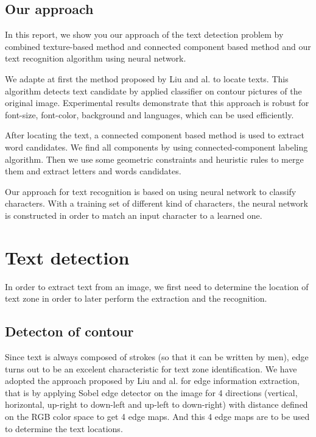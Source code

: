 \documentclass[paper=a4, french, 11pt]{scrartcl}
\begin{document}
\subsection{Our approach}
In this report, we show you our approach of the text detection problem by combined texture-based method and connected component based method and our text recognition algorithm using neural network. 

We adapte at first the method proposed by Liu and al. to locate texts. This algorithm detects text candidate by applied classifier on contour pictures of the original image. Experimental results demonstrate that this approach is robust for font-size, font-color, background and languages, which can be used efficiently.

After locating the text, a connected component based method is used to extract word candidates. We find all components by using connected-component labeling algorithm. Then we use some geometric constraints and heuristic rules to merge them and extract letters and words candidates.  

Our approach for text recognition is based on using neural network to classify characters. With a training set of different kind of characters, the neural network is constructed in order to match an input character to a learned one. 

\section{Text detection}
In order to extract text from an image, we first need to determine the location of text zone in order to later perform the extraction and the recognition.  
\subsection{Detecton of contour}
Since text is always composed of strokes (so that it can be written by men), edge turns out to be an excelent characteristic for text zone identification. We have adopted the approach proposed by Liu and al. for edge information extraction, that is by applying Sobel edge detector on the image for 4 directions (vertical, horizontal, up-right to down-left and up-left to down-right) with distance defined on the RGB color space to get 4 edge maps. And this 4 edge maps are to be used to determine the text locations.
\end{document}
